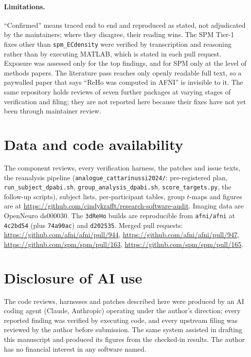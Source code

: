 \documentclass[11pt]{article}
\newcommand{\code}[1]{\texttt{#1}}
\begin{document}
\paragraph{Limitations.} ``Confirmed'' means traced end to end and reproduced as stated, not adjudicated by the maintainers; where they disagree, their reading wins. The SPM Tier-1 fixes other than \code{spm\_ECdensity} were verified by transcription and reasoning rather than by executing MATLAB, which is stated in each pull request. Exposure was assessed only for the top findings, and for SPM only at the level of methods papers. The literature pass reaches only openly readable full text, so a paywalled paper that says ``ReHo was computed in AFNI'' is invisible to it. The same repository holds reviews of seven further packages at varying stages of verification and filing; they are not reported here because their fixes have not yet been through maintainer review.

\section*{Data and code availability}
The component reviews, every verification harness, the patches and issue texts, the reanalysis pipeline (\code{analogue\_cattarinussi2024/}: pre-registered plan, \code{run\_subject\_dpabi.sh}, \code{group\_analysis\_dpabi.sh}, \code{score\_targets.py}, the follow-up scripts), subject lists, per-participant tables, group $t$-maps and figures are at \url{https://github.com/cindykrafft/research-software-audit}. Imaging data are OpenNeuro ds000030. The \code{3dReHo} builds are reproducible from \code{afni/afni} at \code{4c2bd54} (plus \code{74a90ac}) and \code{d202535}. Merged pull requests: \url{https://github.com/afni/afni/pull/944}, \url{https://github.com/afni/afni/pull/947}, \url{https://github.com/spm/spm/pull/163}, \url{https://github.com/spm/spm/pull/165}.

\section*{Disclosure of AI use}
The code reviews, harnesses and patches described here were produced by an AI coding agent (Claude, Anthropic) operating under the author's direction; every reported finding was verified by executing code, and every upstream filing was reviewed by the author before submission. The same system assisted in drafting this manuscript and produced its figures from the checked-in results. The author has no financial interest in any software named.
\end{document}
